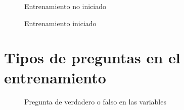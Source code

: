{\begin{figure}[H]
\centering
 \caption{Entrenamiento no iniciado}
 \label{fig:eniniciado} 
\end{figure}

\begin{figure}[H]
\centering
 \caption{Entrenamiento iniciado}
 \label{fig:einiciado} 
\end{figure}

\section{Tipos de preguntas en el entrenamiento}

\begin{figure}[H]
\centering
 \caption{Pregunta de verdadero o falso en las variables}
 \label{fig:pregvar} 
\end{figure}

}
